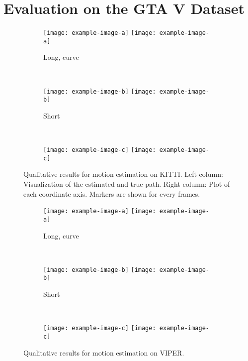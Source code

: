 		
	\section{Evaluation on the GTA V Dataset}
		
		\begin{figure}
			\centering
			\begin{subfigure}[b]{\linewidth}
				\centering
				\texttt{[image: example-image-a]}
				\texttt{[image: example-image-a]}
				\caption{
					Long, curve
					\label{fig:0}
				}
			\end{subfigure}%
			\\
			\begin{subfigure}[b]{\linewidth}
				\centering
				\texttt{[image: example-image-b]}
				\texttt{[image: example-image-b]}
				\caption{
					Short
					\label{fig:0}
				}
			\end{subfigure}%
			\\
			\begin{subfigure}[b]{\linewidth}
				\centering
				\texttt{[image: example-image-c]}
				\texttt{[image: example-image-c]}
				\caption{
					\label{fig:0}
				}
			\end{subfigure}%
			\caption[Qualitative results for motion estimation on KITTI]
					{Qualitative results for motion estimation on KITTI.
				 Left column: Visualization of the estimated and true path.
				 Right column: Plot of each coordinate axis.
				 Markers are shown for every  frames.
					\label{fig:0}}
		\end{figure}


		\begin{figure}
			\centering
			\begin{subfigure}[b]{\linewidth}
				\centering
				\texttt{[image: example-image-a]}
				\texttt{[image: example-image-a]}
				\caption{
					Long, curve
					\label{fig:0}
				}
			\end{subfigure}%
			\\
			\begin{subfigure}[b]{\linewidth}
				\centering
				\texttt{[image: example-image-b]}
				\texttt{[image: example-image-b]}
				\caption{
					Short
					\label{fig:0}
				}
			\end{subfigure}%
			\\
			\begin{subfigure}[b]{\linewidth}
				\centering
				\texttt{[image: example-image-c]}
				\texttt{[image: example-image-c]}
				\caption{
					\label{fig:0}
				}
			\end{subfigure}%
			\caption[Qualitative results for motion estimation on VIPER]
					{Qualitative results for motion estimation on VIPER.
				 \label{fig:0}}
		\end{figure}